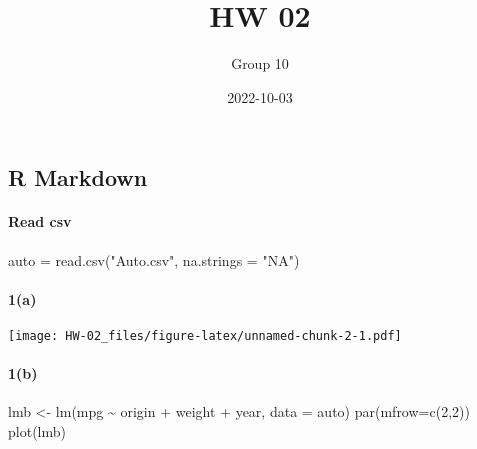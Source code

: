 \documentclass[
]{article}
\title{HW 02}
\author{Group 10}
\date{2022-10-03}
\newenvironment{Shaded}{\begin{snugshade}}{\end{snugshade}}
\newcommand{\AttributeTok}[1]{\textcolor[rgb]{0.77,0.63,0.00}{#1}}
\newcommand{\DecValTok}[1]{\textcolor[rgb]{0.00,0.00,0.81}{#1}}
\newcommand{\FunctionTok}[1]{\textcolor[rgb]{0.00,0.00,0.00}{#1}}
\newcommand{\NormalTok}[1]{#1}
\newcommand{\OtherTok}[1]{\textcolor[rgb]{0.56,0.35,0.01}{#1}}
\newcommand{\SpecialCharTok}[1]{\textcolor[rgb]{0.00,0.00,0.00}{#1}}
\newcommand{\StringTok}[1]{\textcolor[rgb]{0.31,0.60,0.02}{#1}}
\begin{document}
\maketitle

\hypertarget{r-markdown}{%
\subsection{R Markdown}\label{r-markdown}}

\hypertarget{read-csv}{%
\paragraph{Read csv}\label{read-csv}}

\begin{Shaded}
\begin{Highlighting}[]
\NormalTok{auto }\OtherTok{=} \FunctionTok{read.csv}\NormalTok{(}\StringTok{"Auto.csv"}\NormalTok{, }\AttributeTok{na.strings =} \StringTok{"NA"}\NormalTok{)}
\end{Highlighting}
\end{Shaded}

\hypertarget{a}{%
\paragraph{1(a)}\label{a}}

\begin{Shaded}
\end{Shaded}

\texttt{[image: HW-02\_files/figure-latex/unnamed-chunk-2-1.pdf]}

\hypertarget{b}{%
\paragraph{1(b)}\label{b}}

\begin{Shaded}
\begin{Highlighting}[]
\NormalTok{lmb }\OtherTok{\textless{}{-}} \FunctionTok{lm}\NormalTok{(mpg }\SpecialCharTok{\textasciitilde{}}\NormalTok{ origin }\SpecialCharTok{+}\NormalTok{ weight }\SpecialCharTok{+}\NormalTok{ year, }\AttributeTok{data =}\NormalTok{ auto)}
\FunctionTok{par}\NormalTok{(}\AttributeTok{mfrow=}\FunctionTok{c}\NormalTok{(}\DecValTok{2}\NormalTok{,}\DecValTok{2}\NormalTok{))}
\FunctionTok{plot}\NormalTok{(lmb)}
\end{Highlighting}
\end{Shaded}
\end{document}
